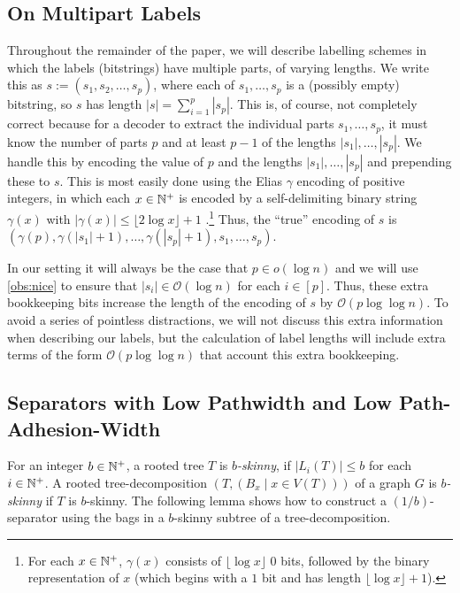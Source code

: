 \documentclass{patmorin}
\renewcommand{\le}{\leqslant}
\newcommand{\defin}[1]{\emph{\textcolor{brightmaroon}{#1}}}
\newcommand{\Oh}{\mathcal{O}}
\begin{document}
  \subsection{On Multipart Labels}
  \label{multipart}

  Throughout the remainder of the paper, we will describe labelling schemes in which the labels (bitstrings) have multiple parts, of varying lengths.  We write this as $s:=(s_1,s_2,\ldots,s_p)$, where each of $s_1,\ldots,s_p$ is a (possibly empty) bitstring, so $s$ has length $|s|=\sum_{i=1}^p|s_p|$.  This is, of course, not completely correct because for a decoder to extract the individual parts $s_1,\ldots,s_p$, it must know the number of parts $p$ and at least $p-1$ of the lengths $|s_1|,\ldots,|s_p|$.  We handle this by encoding the value of $p$ and the lengths $|s_1|,\ldots,|s_{p}|$ and prepending these to $s$. This is most easily done using the Elias $\gamma$ encoding of positive integers, in which each $x\in\mathbb{N}^+$ is encoded by a self-delimiting binary string $\gamma(x)$ with $|\gamma(x)|\le \lfloor 2\log x  \rfloor  + 1$ \cite{elias:universal}.\footnote{For each $x\in\mathbb{N}^+$, $\gamma(x)$ consists of $\lfloor\log x\rfloor$ 0 bits, followed by the binary representation of $x$ (which begins with a $1$ bit and has length $\lfloor\log x\rfloor+1$).}  Thus, the ``true'' encoding of $s$ is $(\gamma(p),\gamma(|s_1|+1),\ldots,\gamma(|s_p|+1),s_1,\ldots,s_p)$.

  In our setting it will always be the case that $p\in o(\log n)$ and we will use \cref{obs:nice} to ensure that $|s_i|\in \Oh(\log n)$ for each $i\in[p]$.
  Thus, these extra bookkeeping bits increase the length of the encoding of $s$ by $\Oh(p\log\log n)$.  To avoid a series of pointless distractions, we will not discuss this extra information when describing our labels, but the calculation of label lengths will include extra terms of the form $\Oh(p\log\log n)$ that account this extra bookkeeping.


  \subsection{Separators with Low Pathwidth and Low Path-Adhesion-Width}

  For an integer $b\in\mathbb{N}^+$,
  a rooted tree $T$ is \defin{$b$-skinny},
  if $|L_i(T)|\le b$ for each $i\in\mathbb{N}^+$.  A rooted tree-decomposition $(T,(B_x\mid x\in V(T)))$ of a graph $G$ is \defin{$b$-skinny} if $T$ is $b$-skinny.  The following lemma shows how to construct a $(1/b)$-separator using the bags in a $b$-skinny subtree of a tree-decomposition.
\end{document}
